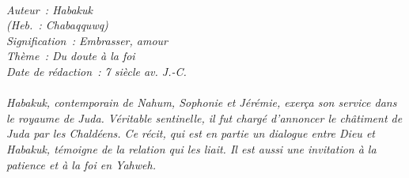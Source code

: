 \BFont
\noindent\hrulefill
{\footnotesize
\textit{
\bigskip
{\centering{}
\\Auteur~: Habakuk
\\(Heb.~: Chabaqquwq)
\\Signification~: Embrasser, amour
\\Thème~: Du doute à la foi
\\Date de rédaction~: 7 siècle av. J.-C.\\}
}
\textit{
\\Habakuk, contemporain de Nahum, Sophonie et Jérémie, exerça son service dans le royaume de Juda. Véritable sentinelle, il fut chargé d'annoncer le châtiment de Juda par les Chaldéens. Ce récit, qui est en partie un dialogue entre Dieu et Habakuk, témoigne de la relation qui les liait. Il est aussi une invitation à la patience et à la foi en Yahweh.\bigskip
}
}
\par\nobreak\noindent\hrulefill
